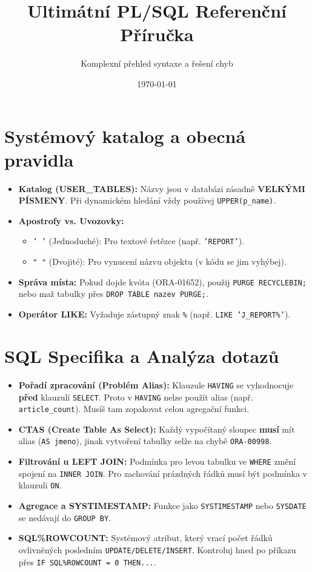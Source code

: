 \documentclass[12pt,a4paper]{article}
\title{\textbf{Ultimátní PL/SQL Referenční Příručka}}
\author{Komplexní přehled syntaxe a řešení chyb}
\date{\today}
\begin{document}
\maketitle
\tableofcontents
\newpage

\section{Systémový katalog a obecná pravidla}
\begin{itemize}
    \item \textbf{Katalog (USER\_TABLES):} Názvy jsou v databázi zásadně \textbf{VELKÝMI PÍSMENY}. Při dynamickém hledání vždy používej \texttt{UPPER(p\_name)}.
    \item \textbf{Apostrofy vs. Uvozovky:}
    \begin{itemize}
        \item \texttt{' '} (Jednoduché): Pro textové řetězce (např. \texttt{'REPORT'}).
        \item \texttt{" "} (Dvojité): Pro vynucení názvu objektu (v kódu se jim vyhýbej).
    \end{itemize}
    \item \textbf{Správa místa:} Pokud dojde kvóta (ORA-01652), použij \texttt{PURGE RECYCLEBIN;} nebo maž tabulky přes \texttt{DROP TABLE nazev PURGE;}.
    \item \textbf{Operátor LIKE:} Vyžaduje zástupný znak \texttt{\%} (např. \texttt{LIKE 'J\_REPORT\%'}).
\end{itemize}

\section{SQL Specifika a Analýza dotazů}
\begin{itemize}
    \item \textbf{Pořadí zpracování (Problém Alias):} Klauzule \texttt{HAVING} se vyhodnocuje \textbf{před} klauzulí \texttt{SELECT}. Proto v \texttt{HAVING} nelze použít alias (např. \texttt{article\_count}). Musíš tam zopakovat celou agregační funkci.
    \item \textbf{CTAS (Create Table As Select):} Každý vypočítaný sloupec \textbf{musí} mít alias (\texttt{AS jmeno}), jinak vytvoření tabulky selže na chybě \texttt{ORA-00998}.
    \item \textbf{Filtrování u LEFT JOIN:} Podmínka pro levou tabulku ve \texttt{WHERE} změní spojení na \texttt{INNER JOIN}. Pro zachování prázdných řádků musí být podmínka v klauzuli \texttt{ON}.
    \item \textbf{Agregace a SYSTIMESTAMP:} Funkce jako \texttt{SYSTIMESTAMP} nebo \texttt{SYSDATE} se nedávají do \texttt{GROUP BY}.
    \item \textbf{SQL\%ROWCOUNT:} Systémový atribut, který vrací počet řádků ovlivněných posledním \texttt{UPDATE/DELETE/INSERT}. Kontroluj hned po příkazu přes \texttt{IF SQL\%ROWCOUNT = 0 THEN...}.
\end{itemize}
\end{document}
